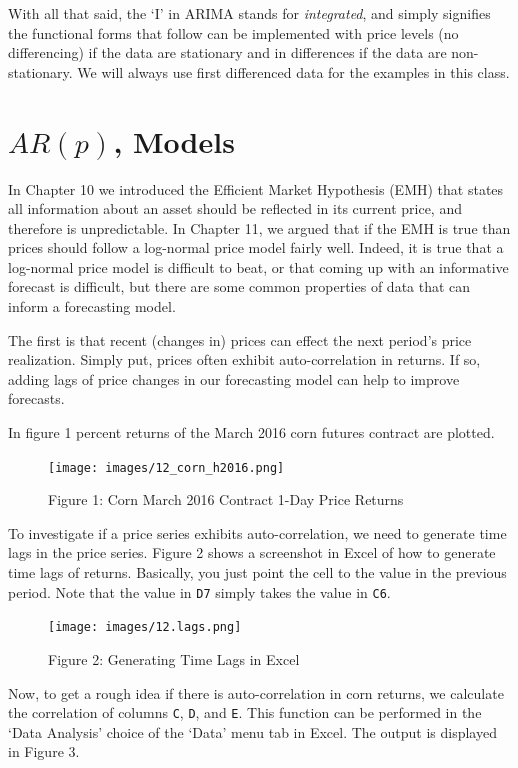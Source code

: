\documentclass[
]{book}
\begin{document}
With all that said, the `I' in ARIMA stands for \emph{integrated}, and simply signifies the functional forms that follow can be implemented with price levels (no differencing) if the data are stationary and in differences if the data are non-stationary. We will always use first differenced data for the examples in this class.

\hypertarget{arp-models}{%
\section{\texorpdfstring{\(AR(p)\), Models}{AR(p), Models}}\label{arp-models}}

In Chapter 10 we introduced the Efficient Market Hypothesis (EMH) that states all information about an asset should be reflected in its current price, and therefore is unpredictable. In Chapter 11, we argued that if the EMH is true than prices should follow a log-normal price model fairly well. Indeed, it is true that a log-normal price model is difficult to beat, or that coming up with an informative forecast is difficult, but there are some common properties of data that can inform a forecasting model.

The first is that recent (changes in) prices can effect the next period's price realization. Simply put, prices often exhibit auto-correlation in returns. If so, adding lags of price changes in our forecasting model can help to improve forecasts.

In figure 1 percent returns of the March 2016 corn futures contract are plotted.

\begin{figure}
\centering
\texttt{[image: images/12\_corn\_h2016.png]}
\caption{Figure 1: Corn March 2016 Contract 1-Day Price Returns}
\end{figure}

To investigate if a price series exhibits auto-correlation, we need to generate time lags in the price series. Figure 2 shows a screenshot in Excel of how to generate time lags of returns. Basically, you just point the cell to the value in the previous period. Note that the value in \texttt{D7} simply takes the value in \texttt{C6}.

\begin{figure}
\centering
\texttt{[image: images/12.lags.png]}
\caption{Figure 2: Generating Time Lags in Excel}
\end{figure}

Now, to get a rough idea if there is auto-correlation in corn returns, we calculate the correlation of columns \texttt{C}, \texttt{D}, and \texttt{E}. This function can be performed in the `Data Analysis' choice of the `Data' menu tab in Excel. The output is displayed in Figure 3.
\end{document}
